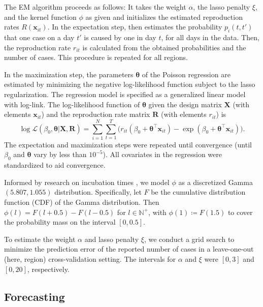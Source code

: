 \documentclass[sigconf, review = false, nonacm = true]{acmart}
\begin{document}
The EM algorithm proceeds as follows: It takes the weight $\alpha$, the lasso penalty $\xi$, and the kernel function $\phi$ as given and initializes the estimated reproduction rates $R(\bm x_{it})$. In the expectation step, then estimates the probability $p_i(t,t')$ that one case on a day $t'$ is caused by one in day $t$, for all days in the data. Then, the reproduction rate $r_{it}$ is calculated from the obtained probabilities and the number of cases. This procedure is repeated for all regions. 

In the maximization step, the parameters $\bm \theta$ of the Poisson regression are estimated by minimizing the negative log-likelihood function subject to the lasso regularization. The regression model is specified as a generalized linear model with log-link. The log-likelihood function of $\bm \theta$ given the design matrix $\bm X$ (with elements $\bm x_{it}$) and the reproduction rate matrix $\bm R$ (with elements $r_{it}$) is 
\begin{equation*}
    \log \mathscr L(\beta_0, \bm \theta | \bm X, \bm R) 
    = \sum^N_{i=1} \sum^T_{t=1}
    \Big(
    r_{it}(\beta_0 + \bm \theta^\top \bm x_{it}) - \exp(\beta_0 + \bm \theta^\top \bm x_{it})
    \Big).
\end{equation*}
The expectation and maximization steps were repeated until convergence (until $\beta_0$ and $\bm \theta$ vary by less than $10^{-5}$). All covariates in the regression were standardized to aid convergence. 

Informed by research on incubation times \cite{lauer_incubation_2020}, we model $\phi$ as a discretized Gamma$(5.807, 1.055)$ distribution. Specifically, let $F$ be the cumulative distribution function (CDF) of the Gamma distribution. Then $\phi(l) = F(l+0.5) - F(l-0.5)$ for $l \in \mathbb N^+$, with $\phi(1) \coloneqq F(1.5)$ to cover the probability mass on the interval $[0,0.5]$. 

To estimate the weight $\alpha$ and lasso penalty $\xi$, we conduct a grid search to minimize the prediction error of the reported number of cases in a leave-one-out (here, region) cross-validation setting. The intervals for $\alpha$ and $\xi$ were $[0,3]$ and $[0,20]$, respectively.

\subsection{Forecasting}
\end{document}
